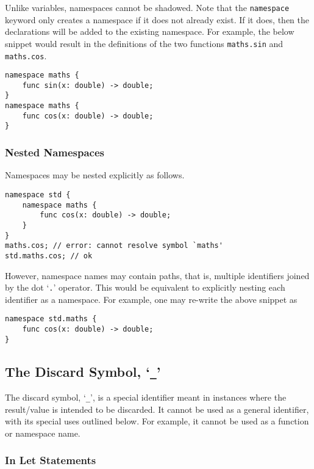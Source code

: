 Unlike variables, namespaces cannot be shadowed.
Note that the \texttt{namespace} keyword only creates a namespace if it does not already exist.
If it does, then the declarations will be added to the existing namespace.
For example, the below snippet would result in the definitions of the two functions \texttt{maths.sin} and \texttt{maths.cos}.

\begin{lstlisting}[language=CustomLang]
namespace maths {
    func sin(x: double) -> double;
}
namespace maths {
    func cos(x: double) -> double;
}
\end{lstlisting}

\subsubsection{Nested Namespaces}

Namespaces may be nested explicitly as follows.

\begin{lstlisting}[language=CustomLang]
namespace std {
    namespace maths {
        func cos(x: double) -> double;
    }
}
maths.cos; // error: cannot resolve symbol `maths'
std.maths.cos; // ok
\end{lstlisting}

However, namespace names may contain paths, that is, multiple identifiers joined by the dot `\texttt{.}' operator.
This would be equivalent to explicitly nesting each identifier as a namespace.
For example, one may re-write the above snippet as

\begin{lstlisting}[language=CustomLang]
namespace std.maths {
    func cos(x: double) -> double;
}
\end{lstlisting}

\subsection{The Discard Symbol, `\texttt{\_}'}

The discard symbol, `\texttt{\_}', is a special identifier meant in instances where the result/value is intended to be discarded.
It cannot be used as a general identifier, with its special uses outlined below.
For example, it cannot be used as a function or namespace name.

\subsubsection{In Let Statements}

